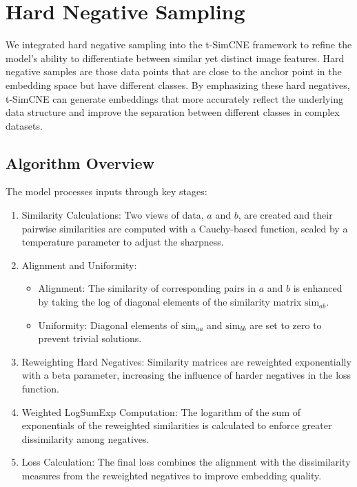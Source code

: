 \section{Hard Negative Sampling}
We integrated hard negative sampling into the t-SimCNE framework to refine the model's ability to differentiate between similar yet distinct image features. 
Hard negative samples are those data points that are close to the anchor point in the embedding space but have different classes. By emphasizing these hard negatives, t-SimCNE can generate embeddings that more accurately reflect the underlying data structure and improve the separation between different classes in complex datasets.

\subsection{Algorithm Overview}
The model processes inputs through key stages:

\begin{enumerate}
  \item Similarity Calculations: 
  Two views of data, \(a\) and \(b\), are created and their pairwise similarities are computed with a Cauchy-based function, scaled by a temperature parameter to adjust the sharpness.

  \item Alignment and Uniformity:
  \begin{itemize}
    \item Alignment: The similarity of corresponding pairs in \(a\) and \(b\) is enhanced by taking the log of diagonal elements of the similarity matrix \( \text{sim}_{ab} \).
    \item Uniformity: Diagonal elements of \( \text{sim}_{aa} \) and \( \text{sim}_{bb} \) are set to zero to prevent trivial solutions.
  \end{itemize}

  \item Reweighting Hard Negatives:
  Similarity matrices are reweighted exponentially with a beta parameter, increasing the influence of harder negatives in the loss function.

  \item Weighted LogSumExp Computation:
  The logarithm of the sum of exponentials of the reweighted similarities is calculated to enforce greater dissimilarity among negatives.

  \item Loss Calculation:
  The final loss combines the alignment with the dissimilarity measures from the reweighted negatives to improve embedding quality.
\end{enumerate}


